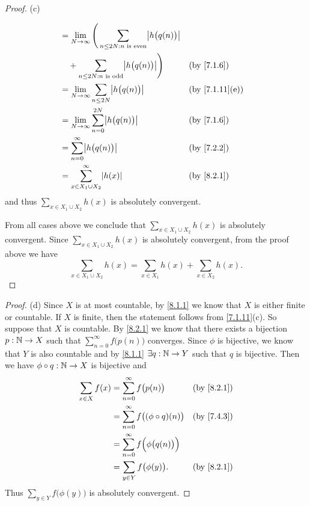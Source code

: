 \begin{proof}{(c)}
\begin{itemize}
\begin{align*}
             & = \lim_{N \to \infty} \Bigg(\sum_{n \leq 2N : n \text{ is even}} \abs{h\big(q(n)\big)}                                                                \\
             & \quad + \sum_{n \leq 2N : n \text{ is odd}} \abs{h\big(q(n)\big)}\Bigg)                                             &  & \by{7.1.6}                   \\
             & = \lim_{N \to \infty} \sum_{n \leq 2N} \abs{h\big(q(n)\big)}                                                        &  & \text{(by \cref{7.1.11}(e))} \\
             & = \lim_{N \to \infty} \sum_{n = 0}^{2N} \abs{h\big(q(n)\big)}                                                       &  & \by{7.1.6}                   \\
             & = \sum_{n = 0}^\infty \abs{h\big(q(n)\big)}                                                                         &  & \by{7.2.2}                   \\
             & = \sum_{x \in X_1 \cup X_2}^\infty \abs{h(x)}                                                                       &  & \by{8.2.1}
          \end{align*}
          and thus \(\sum_{x \in X_1 \cup X_2} h(x)\) is absolutely convergent.
  \end{itemize}
  From all cases above we conclude that \(\sum_{x \in X_1 \cup X_2} h(x)\) is absolutely convergent.
  Since \(\sum_{x \in X_1 \cup X_2} h(x)\) is absolutely convergent, from the proof above we have
  \[
    \sum_{x \in X_1 \cup X_2} h(x) = \sum_{x \in X_1} h(x) + \sum_{x \in X_2} h(x).
  \]
\end{proof}

\begin{proof}{(d)}
  Since \(X\) is at most countable, by \cref{8.1.1} we know that \(X\) is either finite or countable.
  If \(X\) is finite, then the statement follows from \cref{7.1.11}(c).
  So suppose that \(X\) is countable.
  By \cref{8.2.1} we know that there exists a bijection \(p : \mathbb{N} \to X\) such that \(\sum_{n = 0}^\infty f\big(p(n)\big)\) converges.
  Since \(\phi\) is bijective, we know that \(Y\) is also countable and by \cref{8.1.1} \(\exists q : \mathbb{N} \to Y\) such that \(q\) is bijective.
  Then we have \(\phi \circ q : \mathbb{N} \to X\) is bijective and
  \begin{align*}
    \sum_{x \in X} f(x) & = \sum_{n = 0}^\infty f\big(p(n)\big)               &  & \by{8.2.1} \\
                        & = \sum_{n = 0}^\infty f\big((\phi \circ q)(n)\big)  &  & \by{7.4.3} \\
                        & = \sum_{n = 0}^\infty f\Big(\phi\big(q(n)\big)\Big)                 \\
                        & = \sum_{y \in Y} f\big(\phi(y)\big).                &  & \by{8.2.1}
  \end{align*}
  Thus \(\sum_{y \in Y} f\big(\phi(y)\big)\) is absolutely convergent.
\end{proof}

